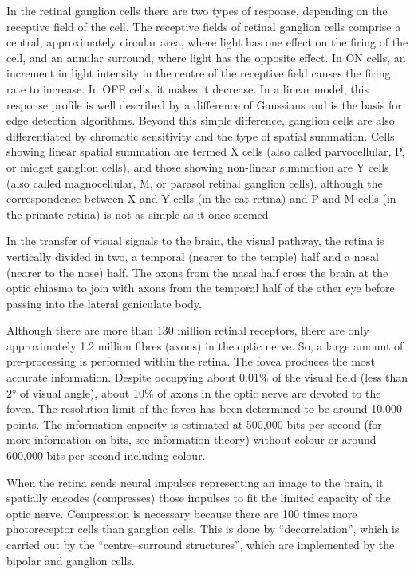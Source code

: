 \documentclass[]{book}
\begin{document}
In the retinal ganglion cells there are two types of response, depending on the receptive field of the cell. The receptive fields of retinal ganglion cells comprise a central, approximately circular area, where light has one effect on the firing of the cell, and an annular surround, where light has the opposite effect. In ON cells, an increment in light intensity in the centre of the receptive field causes the firing rate to increase. In OFF cells, it makes it decrease. In a linear model, this response profile is well described by a difference of Gaussians and is the basis for edge detection algorithms. Beyond this simple difference, ganglion cells are also differentiated by chromatic sensitivity and the type of spatial summation. Cells showing linear spatial summation are termed X cells (also called parvocellular, P, or midget ganglion cells), and those showing non-linear summation are Y cells (also called magnocellular, M, or parasol retinal ganglion cells), although the correspondence between X and Y cells (in the cat retina) and P and M cells (in the primate retina) is not as simple as it once seemed.

In the transfer of visual signals to the brain, the visual pathway, the retina is vertically divided in two, a temporal (nearer to the temple) half and a nasal (nearer to the nose) half. The axons from the nasal half cross the brain at the optic chiasma to join with axons from the temporal half of the other eye before passing into the lateral geniculate body.

Although there are more than 130 million retinal receptors, there are only approximately 1.2 million fibres (axons) in the optic nerve. So, a large amount of pre-processing is performed within the retina. The fovea produces the most accurate information. Despite occupying about 0.01\% of the visual field (less than 2° of visual angle), about 10\% of axons in the optic nerve are devoted to the fovea. The resolution limit of the fovea has been determined to be around 10,000 points. The information capacity is estimated at 500,000 bits per second (for more information on bits, see information theory) without colour or around 600,000 bits per second including colour.

When the retina sends neural impulses representing an image to the brain, it spatially encodes (compresses) those impulses to fit the limited capacity of the optic nerve. Compression is necessary because there are 100 times more photoreceptor cells than ganglion cells. This is done by ``decorrelation'', which is carried out by the ``centre--surround structures'', which are implemented by the bipolar and ganglion cells.
\end{document}

